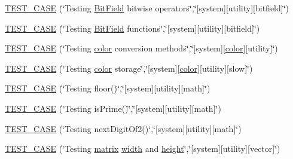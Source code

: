 \begin{DoxyCompactItemize}
\item 
\hyperlink{namespacemc_ac2dab68a1d5a5e67a66a09daf5e7e8df}{T\+E\+S\+T\+\_\+\+C\+A\+SE} (\char`\"{}Testing \hyperlink{structmc_1_1_bit_field}{Bit\+Field} bitwise operators\char`\"{},\char`\"{}\mbox{[}system\mbox{]}\mbox{[}utility\mbox{]}\mbox{[}bitfield\mbox{]}\char`\"{})
\item 
\hyperlink{namespacemc_a421b5df5d2c6c711e27a804c410192a5}{T\+E\+S\+T\+\_\+\+C\+A\+SE} (\char`\"{}Testing \hyperlink{structmc_1_1_bit_field}{Bit\+Field} functions\char`\"{},\char`\"{}\mbox{[}system\mbox{]}\mbox{[}utility\mbox{]}\mbox{[}bitfield\mbox{]}\char`\"{})
\item 
\hyperlink{namespacemc_a26ce660196a7d992d38de0a17b7aeb62}{T\+E\+S\+T\+\_\+\+C\+A\+SE} (\char`\"{}Testing \hyperlink{_s_d_l__opengl__glext_8h_a3ea846f998d64f079b86052b6c4193a8}{color} conversion methods\char`\"{},\char`\"{}\mbox{[}system\mbox{]}\mbox{[}\hyperlink{_s_d_l__opengl__glext_8h_a3ea846f998d64f079b86052b6c4193a8}{color}\mbox{]}\mbox{[}utility\mbox{]}\char`\"{})
\item 
\hyperlink{namespacemc_aaf666b9c8040f47860b223dc802d5319}{T\+E\+S\+T\+\_\+\+C\+A\+SE} (\char`\"{}Testing \hyperlink{_s_d_l__opengl__glext_8h_a3ea846f998d64f079b86052b6c4193a8}{color} storage\char`\"{},\char`\"{}\mbox{[}system\mbox{]}\mbox{[}\hyperlink{_s_d_l__opengl__glext_8h_a3ea846f998d64f079b86052b6c4193a8}{color}\mbox{]}\mbox{[}utility\mbox{]}\mbox{[}slow\mbox{]}\char`\"{})
\item 
\hyperlink{namespacemc_abdd6f7184ff2ff5a729ebd4c201d77d8}{T\+E\+S\+T\+\_\+\+C\+A\+SE} (\char`\"{}Testing floor()\char`\"{},\char`\"{}\mbox{[}system\mbox{]}\mbox{[}utility\mbox{]}\mbox{[}math\mbox{]}\char`\"{})
\item 
\hyperlink{namespacemc_a4e0d73a3d41a4c77e0ed228ad5e6e915}{T\+E\+S\+T\+\_\+\+C\+A\+SE} (\char`\"{}Testing is\+Prime()\char`\"{},\char`\"{}\mbox{[}system\mbox{]}\mbox{[}utility\mbox{]}\mbox{[}math\mbox{]}\char`\"{})
\item 
\hyperlink{namespacemc_a5e47a50cd0b9cced5ff2c5a2dee95bb8}{T\+E\+S\+T\+\_\+\+C\+A\+SE} (\char`\"{}Testing next\+Digit\+Of2()\char`\"{},\char`\"{}\mbox{[}system\mbox{]}\mbox{[}utility\mbox{]}\mbox{[}math\mbox{]}\char`\"{})
\item 
\hyperlink{namespacemc_a1ca50da06b0f1fb44467c8aae2a2fb64}{T\+E\+S\+T\+\_\+\+C\+A\+SE} (\char`\"{}Testing \hyperlink{_s_d_l__opengl__glext_8h_a7b24a3f2f56eb1244ae69dacb4fecb6f}{matrix} \hyperlink{_s_d_l__opengl_8h_a9a82cf3caff84cabc4598e2619faac17}{width} and \hyperlink{_s_d_l__opengl_8h_aa352f2804b9902ac30769c00dde75d5f}{height}\char`\"{},\char`\"{}\mbox{[}system\mbox{]}\mbox{[}utility\mbox{]}\mbox{[}vector\mbox{]}\char`\"{})

\end{DoxyCompactItemize}
